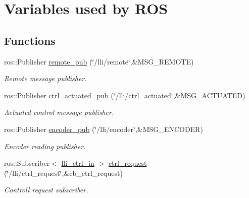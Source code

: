 \hypertarget{group__ROSSetup}{}\section{Variables used by R\+OS}
\label{group__ROSSetup}
\subsection*{Functions}
\begin{DoxyCompactItemize}
\item 
ros\+::\+Publisher \hyperlink{group__ROSSetup_ga93b3bd1d04d33169e1a28258a8b07af7}{remote\+\_\+pub} (\char`\"{}/lli/remote\char`\"{},\&M\+S\+G\+\_\+\+R\+E\+M\+O\+TE)\hypertarget{group__ROSSetup_ga93b3bd1d04d33169e1a28258a8b07af7}{}\label{group__ROSSetup_ga93b3bd1d04d33169e1a28258a8b07af7}

\begin{DoxyCompactList}\small\item\em Remote message publisher. \end{DoxyCompactList}\item 
ros\+::\+Publisher \hyperlink{group__ROSSetup_ga3053db74e7b16c6af3d7eda6d8b0c83c}{ctrl\+\_\+actuated\+\_\+pub} (\char`\"{}/lli/ctrl\+\_\+actuated\char`\"{},\&M\+S\+G\+\_\+\+A\+C\+T\+U\+A\+T\+ED)\hypertarget{group__ROSSetup_ga3053db74e7b16c6af3d7eda6d8b0c83c}{}\label{group__ROSSetup_ga3053db74e7b16c6af3d7eda6d8b0c83c}

\begin{DoxyCompactList}\small\item\em Actuated control message publisher. \end{DoxyCompactList}\item 
ros\+::\+Publisher \hyperlink{group__ROSSetup_gae33f55282b004e6f50e44ec7df40c321}{encoder\+\_\+pub} (\char`\"{}/lli/encoder\char`\"{},\&M\+S\+G\+\_\+\+E\+N\+C\+O\+D\+ER)\hypertarget{group__ROSSetup_gae33f55282b004e6f50e44ec7df40c321}{}\label{group__ROSSetup_gae33f55282b004e6f50e44ec7df40c321}

\begin{DoxyCompactList}\small\item\em Encoder reading publisher. \end{DoxyCompactList}\item 
ros\+::\+Subscriber$<$ \hyperlink{svea__arduino__src_8h_a397644608f772ef60685f6a938f43ea1}{lli\+\_\+ctrl\+\_\+in} $>$ \hyperlink{group__ROSSetup_ga9fcbca83450aa2c5c64cde1a0e0557c5}{ctrl\+\_\+request} (\char`\"{}/lli/ctrl\+\_\+request\char`\"{},\&cb\+\_\+ctrl\+\_\+request)\hypertarget{group__ROSSetup_ga9fcbca83450aa2c5c64cde1a0e0557c5}{}\label{group__ROSSetup_ga9fcbca83450aa2c5c64cde1a0e0557c5}

\begin{DoxyCompactList}\small\item\em Controll request subscriber. \end{DoxyCompactList}\end{DoxyCompactItemize}
